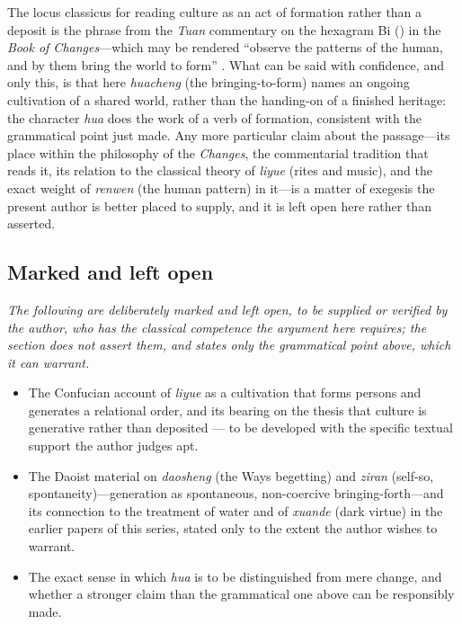 The locus classicus for reading culture as an act of formation rather than a deposit is the phrase from the \emph{Tuan} commentary on the hexagram Bi () in the \emph{Book of Changes}---which may be rendered ``observe the patterns of the human, and by them bring the world to form'' \parencite{legge1963yijing}. What can be said with confidence, and only this, is that here \emph{huacheng} (the bringing-to-form) names an ongoing cultivation of a shared world, rather than the handing-on of a finished heritage: the character \emph{hua} does the work of a verb of formation, consistent with the grammatical point just made. Any more particular claim about the passage---its place within the philosophy of the \emph{Changes}, the commentarial tradition that reads it, its relation to the classical theory of \emph{liyue} (rites and music), and the exact weight of \emph{renwen} (the human pattern) in it---is a matter of exegesis the present author is better placed to supply, and it is left open here rather than asserted.

\subsection*{Marked and left open}

\noindent\emph{The following are deliberately marked and left open, to be supplied or verified by the author, who has the classical competence the argument here requires; the section does not assert them, and states only the grammatical point above, which it can warrant.}
\begin{itemize}
  \item The Confucian account of \emph{liyue} as a cultivation that forms persons and generates a relational order, and its bearing on the thesis that culture is generative rather than deposited --- to be developed with the specific textual support the author judges apt.
  \item The Daoist material on \emph{daosheng} (the Ways begetting) and \emph{ziran} (self-so, spontaneity)---generation as spontaneous, non-coercive bringing-forth---and its connection to the treatment of water and of \emph{xuande} (dark virtue) in the earlier papers of this series, stated only to the extent the author wishes to warrant.
  \item The exact sense in which \emph{hua} is to be distinguished from mere change, and whether a stronger claim than the grammatical one above can be responsibly made.
\end{itemize}

